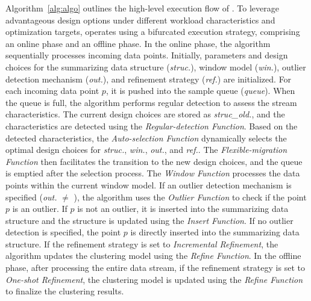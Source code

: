 Algorithm~\ref{alg:algo} outlines the high-level execution flow of \algo. To leverage advantageous design options under different workload characteristics and optimization targets, \algo operates using a bifurcated execution strategy, comprising an online phase and an offline phase.
In the online phase, the algorithm sequentially processes incoming data points. Initially, parameters and design choices for the summarizing data structure (\textit{struc.}), window model (\textit{win.}), outlier detection mechanism (\textit{out.}), and refinement strategy (\textit{ref.}) are initialized. For each incoming data point \( p \), it is pushed into the sample queue (\textit{queue}). When the queue is full, the algorithm performs regular detection to assess the stream characteristics. The current design choices are stored as \textit{struc\_old.}, and the characteristics are detected using the \emph{Regular-detection Function}. Based on the detected characteristics, the \emph{Auto-selection Function} dynamically selects the optimal design choices for \textit{struc.}, \textit{win.}, \textit{out.}, and \textit{ref.}. The \emph{Flexible-migration Function} then facilitates the transition to the new design choices, and the queue is emptied after the selection process. The \emph{Window Function} processes the data points within the current window model. If an outlier detection mechanism is specified (\textit{out.} $\neq$ \nod), the algorithm uses the \emph{Outlier Function} to check if the point \( p \) is an outlier. If \( p \) is not an outlier, it is inserted into the summarizing data structure and the structure is updated using the \emph{Insert Function}. If no outlier detection is specified, the point \( p \) is directly inserted into the summarizing data structure. If the refinement strategy is set to \textit{Incremental Refinement}, the algorithm updates the clustering model using the \emph{Refine Function}. In the offline phase, after processing the entire data stream, if the refinement strategy is set to \textit{One-shot Refinement}, the clustering model is updated using the \emph{Refine Function} to finalize the clustering results.


